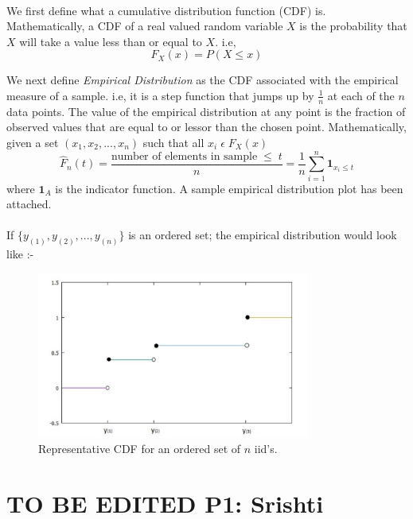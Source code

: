 \documentclass[letterpaper, 12pt] {article}
\begin{document}
	\paragraph{}
	We first define what a cumulative distribution function (CDF) is. Mathematically, a CDF of a real valued random variable $X$ is the probability that $X$ will take a value less than or equal to $X$. i.e, 
	$$F_X(x) = P(X \leq x)$$  
	
	We next define \textit{Empirical Distribution} as the CDF associated with the empirical measure of a sample. i.e, it is a step function that jumps up by $\frac{1}{n}$ at each of the $n$ data points. The value of the empirical distribution at any point is the fraction of observed values that are equal to or lessor than the chosen point. Mathematically, given a set $(x_1, x_2, ..., x_n)$ such that all $x_i\; \epsilon \; F_X(x)$ 
	$$\hat{F}_n (t) = \frac{\text{number of elements in sample}\; \leq\; t}{n} = \frac{1}{n}\sum_{i = 1}^{n} \textbf{1}_{x_{i} \leq t}  $$  
	where $\textbf{1}_A$ is the indicator function. A sample empirical distribution plot has been attached.
	
	\paragraph{}
	If $\{y_{(1)}, y_{(2)}, ..., y_{(n)}\}$ is an ordered set; the empirical distribution would look like :-

	\begin{figure}[h!]
		\centering
		\includegraphics[width=0.8\textwidth]{empirical_cdf_representative}
		\caption{Representative CDF for an ordered set of $n$ iid's.}
		\label{Figure 4}
	\end{figure}
	
	\pagebreak
	
	\section{TO BE EDITED P1: Srishti}
	
\end{document}
